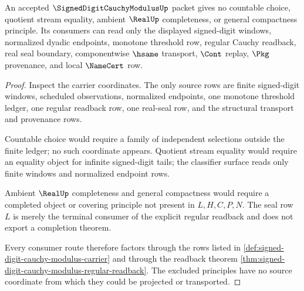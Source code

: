 \begin{theorem}
\label{thm:signed-digit-cauchy-modulus-nonescape}
An accepted $\SignedDigitCauchyModulusUp$ packet gives no countable choice, quotient stream equality, ambient $\RealUp$ completeness, or general compactness principle. Its consumers can read only the displayed signed-digit windows, normalized dyadic endpoints, monotone threshold row, regular Cauchy readback, real seal boundary, componentwise $\hsame$ transport, $\Cont$ replay, $\Pkg$ provenance, and local $\NameCert$ row.
\end{theorem}
\begin{proof}
Inspect the carrier coordinates. The only source rows are finite signed-digit windows, scheduled observations, normalized endpoints, one monotone threshold ledger, one regular readback row, one real-seal row, and the structural transport and provenance rows.

Countable choice would require a family of independent selections outside the finite ledger; no such coordinate appears. Quotient stream equality would require an equality object for infinite signed-digit tails; the classifier surface reads only finite windows and normalized endpoint rows.

Ambient $\RealUp$ completeness and general compactness would require a completed object or covering principle not present in $L,H,C,P,N$. The seal row $L$ is merely the terminal consumer of the explicit regular readback and does not export a completion theorem.

Every consumer route therefore factors through the rows listed in \autoref{def:signed-digit-cauchy-modulus-carrier} and through the readback theorem \autoref{thm:signed-digit-cauchy-modulus-regular-readback}. The excluded principles have no source coordinate from which they could be projected or transported.
\end{proof}


